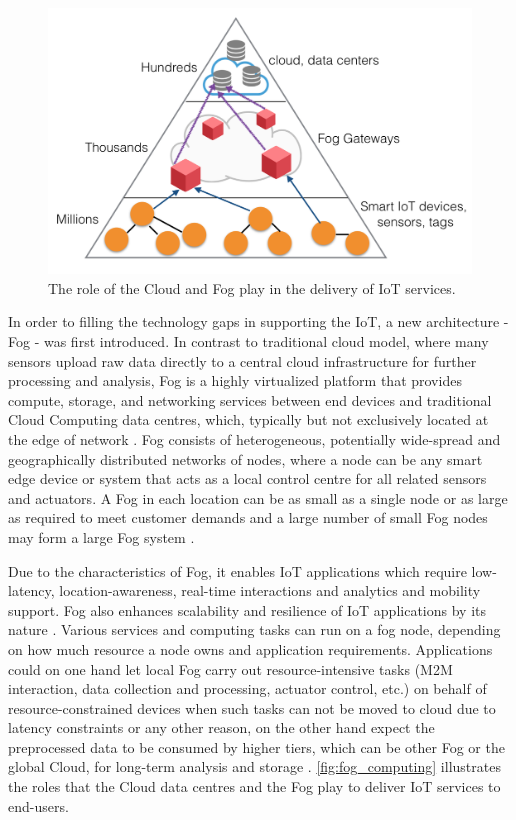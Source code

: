 \begin{figure}[!htbp]
\centering
\includegraphics[scale = 0.55]{fog_computing.png}
\caption[The role of the Cloud and Fog play in the delivery of IoT services]{The role of the Cloud and Fog play in the delivery of IoT services. \cite{7123563}} 
\label{fig:fog_computing}
\end{figure}

In order to filling the technology gaps in supporting the IoT, a new architecture - Fog - was first introduced. In contrast to traditional cloud model, where many sensors upload raw data directly to a central cloud infrastructure for further processing and analysis, Fog is a highly virtualized platform that provides compute, storage, and networking services between end devices and traditional Cloud Computing data centres, which, typically but not exclusively located at the edge of network \cite{Bonomi:2012:FCR:2342509.2342513}.  Fog consists of heterogeneous, potentially wide-spread and geographically distributed networks of nodes, where a node can be any smart edge device or system that acts as a local control centre for all related sensors and actuators. A Fog in each location can be as small as a single node or as large as required to meet customer demands and a large number of small Fog nodes may form a large Fog system \cite{7498684}. 

Due to the characteristics of Fog, it enables IoT applications which require low-latency, location-awareness, real-time interactions and analytics and mobility support. Fog also enhances scalability and resilience of IoT applications by its nature \cite{7123563}. Various services and computing tasks can run on a fog node, depending on how much resource a node owns and application requirements. Applications could on one hand let local Fog carry out resource-intensive tasks (M2M interaction, data collection and processing, actuator control, etc.) on behalf of resource-constrained devices when such tasks can not be moved to cloud due to latency constraints or any other reason, on the other hand expect the preprocessed data to be consumed by higher tiers, which can be other Fog or the global Cloud, for long-term analysis and storage \cite{Bonomi:2012:FCR:2342509.2342513}\cite{7498684}. \autoref{fig:fog_computing} illustrates the roles that the Cloud data centres and the Fog play to deliver IoT services to end-users. 


